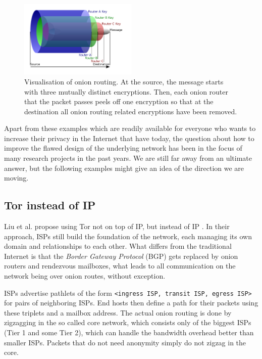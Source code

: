 \documentclass{acm_proc_article-sp}
\begin{document}

\begin{figure}[t]
  \includegraphics[width=0.5\textwidth]{images/tor.png}
  \caption{Visualisation of onion routing. At the source, the message starts with three mutually distinct encryptions. Then, each onion router that the packet passes peels off one encryption so that at the destination all onion routing related encryptions have been removed. \cite{tor-dia}}
  \label{fig:tor}
\end{figure}
Apart from these examples which are readily available for everyone who wants to increase their privacy in the Internet that have today, the question about how to improve the flawed design of the underlying network has been in the focus of many research projects in the past years. We are still far away from an ultimate answer, but the following examples might give an idea of the direction we are moving.
\subsection{Tor instead of IP}
Liu et al. propose using Tor not on top of IP, but instead of IP \cite{tor}. In their approach, ISPs still build the foundation of the network, each managing its own domain and relationships to each other. What differs from the traditional Internet is that the \emph{Border Gateway Protocol} (BGP) gets replaced by onion routers and rendezvous mailboxes, what leads to all communication on the network being over onion routes, without exception.

ISPs advertise pathlets \cite{pathlet} of the form \texttt{<ingress ISP, transit ISP, egress ISP>} for pairs of neighboring ISPs. End hosts then define a path for their packets using these triplets and a mailbox address. The actual onion routing is done by zigzagging in the so called core network, which consists only of the biggest ISPs (Tier 1 and some Tier 2), which can handle the bandwidth overhead better than smaller ISPs. Packets that do not need anonymity simply do not zigzag in the core.
\end{document}
